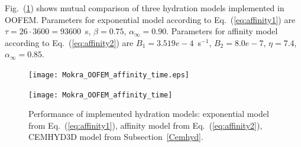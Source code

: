 \documentclass[a4paper]{article}
\newcommand{\refeq}[1]{Eq.~(\ref{#1})}
\newcommand{\reffig}[1]{Fig.~(\ref{#1})}
\begin{document}
\reffig{hydration_comparison} shows mutual comparison of three hydration models implemented in OOFEM. Parameters for exponential model according to \refeq{eq:affinity1} are $\tau=26\cdot3600=93600$~s, $\beta=0.75$, $\alpha_\infty=0.90$. Parameters for affinity model according to \refeq{eq:affinity2} are $B_1=3.519e-4$~s$^{-1}$, $B_2=8.0e-7$, $\eta=7.4$, $\alpha_\infty=0.85$.

\begin{figure}[!htb]
\begin{htmlonly}
  \centerline{\texttt{[image: Mokra\_OOFEM\_affinity\_time.eps]}}
\end{htmlonly}
 \centerline{\texttt{[image: Mokra\_OOFEM\_affinity\_time]}}
  \caption{Performance of implemented hydration models: exponential model from \refeq{eq:affinity1}, affinity model from \refeq{eq:affinity2}, CEMHYD3D model from Subsection~\ref{Cemhyd}.}
  \label{hydration_comparison}
\end{figure}
\end{document}
